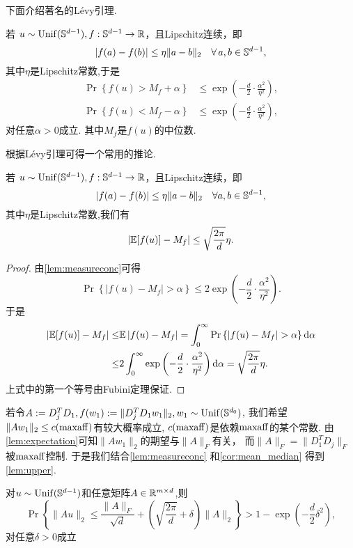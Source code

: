 下面介绍著名的L\'{e}vy引理\cite[页6]{ledoux2005concentration}.
\begin{lemma}\label{lem:measureconc}
  若 \(u \sim \Unif(\mathbb{S}^{d-1}), f:\S^{d-1}\rightarrow
  \R\)，且Lipschitz连续，即
  \[|f(a)-f(b)|\le \eta\|a-b\|_2 \quad \forall\, a, b\in \S^{d-1},\]
  其中\(\eta\)是Lipschitz常数,于是
  \begin{align*} 
    \Pr \left\{f(u)  > M_f + \alpha \right\}&\le \exp \left(-
    \frac{d}{2} \cdot \frac{\alpha^2}{\eta^2} \right),\\
    \Pr \left\{f(u)  < M_f - \alpha\right\}&\le \exp \left(-
    \frac{d}{2} \cdot \frac{\alpha^2}{\eta^2} \right),
  \end{align*}
对任意\(\alpha > 0\)成立. 其中\(M_f\)是\(f(u)\)的中位数.
\end{lemma}
根据L\'{e}vy引理可得一个常用的推论.
\begin{corollary} \label{cor:mean_median}
  若 \(u \sim \Unif(\mathbb{S}^{d-1}), f:\S^{d-1}\rightarrow
  \R\)，且Lipschitz连续，即
  \[|f(a)-f(b)|\le \eta\|a-b\|_2 \quad \forall a, b\in \S^{d-1},\]
  其中\(\eta\)是Lipschitz常数,我们有
  \begin{align}
    |\E[f(u)]-M_f|\le \sqrt{\frac{2\pi}{d}}\eta.
    \label{eq:mean_median}
  \end{align}
\end{corollary}
\begin{proof}
  由\autoref{lem:measureconc}可得
  \[\Pr\left\{|f(u)-M_f|>\alpha\right\} \le 2 \exp \left(
  -\frac{d}{2}\cdot \frac{\alpha^2}{\eta^2} \right).\]
  于是
  \begin{align*}
    |\E[f(u)]-M_f|\le& \E\left|f(u)-M_f\right|= 
    \int_0^\infty \Pr\left\{\left|f(u)-M_f\right|>\alpha \right\}\mathrm{d}\alpha\\
    \le& 2 \int_0^\infty \exp\left( 
    -\frac{d}{2}\cdot \frac{\alpha^2}{\eta^2} \right)\mathrm{d}\alpha =
    \sqrt{\frac{2\pi}{d}}\eta.
  \end{align*}
  上式中的第一个等号由Fubini定理保证.
\end{proof}
若令\(A:=D_j^T D_1, f(w_1):=\|D_j^T D_1 w_1\|_2, w_1\sim \Unif(\S^{d_0})\),
我们希望\(\|A w_1\|_2\le c(\maff)\)有较大概率成立,
\(c(\maff)\)是依赖\(\maff\)的某个常数.
由\autoref{lem:expectation}可知\(\|A w_1\|_2\)的期望与\(\|A\|_F\)有关，
而\(\|A\|_F=\|D_1^T D_j\|_F\)被\(\maff\)控制.
于是我们结合\autoref{lem:measureconc} 和\autoref{cor:mean_median}
得到\autoref{lem:upper}.
\begin{lemma} \label{lem:upper}
  对\(u \sim \Unif(\S^{d-1})\)和任意矩阵\(A\in \R^{m\times d}\),则
  \[
    \Pr \left\{ \| Au \|_2  \le \frac{\|A\|_F}{\sqrt{d}} +
    \left (\sqrt{\frac{2\pi}{d}}+\delta\right )\|A\|_2\right\} > 1- \exp \left(
    -\frac{d}{2} \delta^2 \right),
  \]
  对任意\(\delta>0\)成立
\end{lemma}
